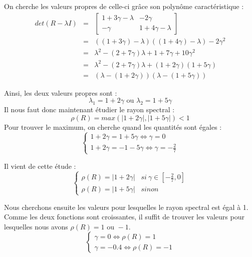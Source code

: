 On cherche les valeurs propres de celle-ci grâce son polynôme caractéristique : 
\begin{eqnarray}
det(R - \lambda I) &=& \begin{bmatrix}
1 + 3\gamma - \lambda   & -2\gamma \\
-\gamma & 1 + 4\gamma - \lambda
\end{bmatrix} \\
&=& ((1 + 3\gamma) - \lambda)((1 + 4\gamma) - \lambda) - 2\gamma^2\\
&=& \lambda^2 - (2 + 7\gamma)\lambda + 1 + 7\gamma + 10\gamma^2\\
&=& \lambda^2 - (2 + 7\gamma)\lambda + (1 + 2\gamma)(1 + 5\gamma)\\
&=& (\lambda - (1 + 2\gamma))(\lambda - (1 + 5\gamma))
\end{eqnarray}

Ainsi, les deux valeurs propres sont : 
\begin{equation}
\lambda_1 = 1 + 2\gamma \text{ ou } \lambda_2 = 1 + 5\gamma
\end{equation}
Il nous faut donc maintenant étudier le rayon spectral :
\begin{equation}
	\rho(R) = max(|1 + 2\gamma|,|1 + 5\gamma|) < 1
\end{equation}
Pour trouver le maximum, on cherche quand les quantités sont égales : 
\begin{equation}
\begin{cases}
1 + 2\gamma = 1+5\gamma \Leftrightarrow \gamma = 0\\
1 + 2\gamma = -1 - 5\gamma \Leftrightarrow \gamma = - \frac{2}{7}
\end{cases}
\end{equation}

Il vient de cette étude : 
\begin{equation}
\begin{cases}
\rho(R) = |1 + 2\gamma| \hspace{10pt} si \ \gamma \in [- \frac{2}{7}, 0]\\
\rho(R) = |1 + 5\gamma| \hspace{10pt} sinon
\end{cases} 
\end{equation}

Nous cherchons ensuite les valeurs pour lesquelles le rayon spectral est égal à 1. Comme les deux fonctions sont croissantes, il suffit de trouver les valeurs pour lesquelles nous avons $\rho(R) = 1 \text{ ou } -1$.
\begin{equation}
\begin{cases}
	\gamma = 0 \Leftrightarrow \rho(R) = 1\\
	\gamma = -0.4 \Leftrightarrow \rho(R) = -1
\end{cases}
\end{equation}


